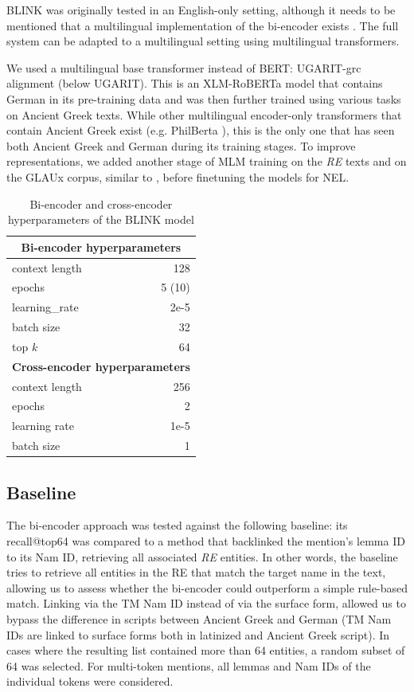 \documentclass[final]{anthology-ch}
\begin{document}
BLINK was originally tested in an English-only setting, although it needs to be mentioned that a multilingual implementation of the bi-encoder exists \cite{Plekhanov_Kassner_Popat_Martin_Merello_Kozlovskii_Dreyer_Cancedda_2023}. The full system can be adapted to a multilingual setting using multilingual transformers.

We used a multilingual base transformer instead of BERT: UGARIT-grc alignment \cite{Yousef_Palladino_Shamsian_d} (below UGARIT). This is an XLM-RoBERTa model that contains German in its pre-training data and was then further trained using various tasks on Ancient Greek texts. While other multilingual encoder-only transformers that contain Ancient Greek exist (e.g. PhilBerta \cite{Riemenschneider_Frank_2023}), this is the only one that has seen both Ancient Greek and German during its training stages. To improve representations, we added another stage of MLM training on the \textit{RE} texts and on the GLAUx corpus, similar to \textcite{Logeswaran_Chang_Lee_Toutanova_Devlin_Lee_2019}, before finetuning the models for NEL.

\begin{table}[ht]
\centering
\begin{tabular}{lr}
\toprule
\multicolumn{2}{c}{\textbf{Bi-encoder hyperparameters}} \\
\midrule
context length & 128 \\
epochs & 5 (10)\\
learning\_rate & 2e-5 \\
batch size & 32 \\
top $k$ & 64 \\
\midrule
\multicolumn{2}{c}{\textbf{Cross-encoder hyperparameters}} \\
\midrule
context length & 256 \\
epochs & 2 \\
learning rate & 1e-5 \\
batch size & 1 \\
\bottomrule
\end{tabular}
\caption{Bi-encoder and cross-encoder hyperparameters of the BLINK model}
\label{tab:combined_hyperparameters}
\end{table}

\subsection{Baseline}\label{sec:baseline}
The bi-encoder approach was tested against the following baseline: its recall@top64 was compared to a method that backlinked the mention’s lemma ID to its Nam ID, retrieving all associated \textit{RE} entities. In other words, the baseline tries to retrieve all entities in the RE that match the target name in the text, allowing us to assess whether the bi-encoder could outperform a simple rule-based match. Linking via the TM Nam ID instead of via the surface form, allowed us to bypass the difference in scripts between Ancient Greek and German (TM Nam IDs are linked to surface forms both in latinized and Ancient Greek script). In cases where the resulting list contained more than 64 entities, a random subset of 64 was selected. For multi-token mentions, all lemmas and Nam IDs of the individual tokens were considered.
\end{document}
